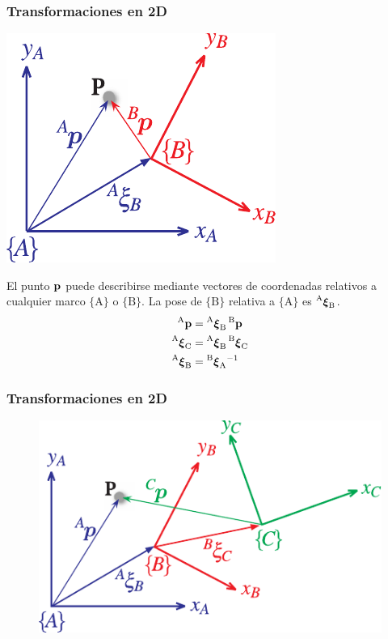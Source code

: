 \begin{frame}
    \frametitle{Transformaciones en 2D}
    \small
    \begin{center}
        \includegraphics[width=0.3\columnwidth]{./images/coordinate_frames.pdf}
    \end{center}


    El punto $\point$ puede describirse mediante vectores de coordenadas relativos a cualquier marco $\{\mathrm{A}\}$ o $\{\mathrm{B}\}$. La pose de $\{\mathrm{B}\}$ relativa a $\{\mathrm{A}\}$ es $\transform{A}{B}$.
    \begin{align*}
        \pointCoord{A} &= \transform{A}{B}\pointCoord{B}\\
        \transform{A}{C} &= \transform{A}{B}\transform{B}{C}\\
        \transform{A}{B} &= \transform{B}{A}^{-1}
    \end{align*}

\end{frame}


\begin{frame}
    \frametitle{Transformaciones en 2D}
    
    \begin{figure}[!h]
        \includegraphics[width=0.6\columnwidth]{./images/multiple_coordinate_frames_2d.pdf}
    \end{figure}

\end{frame}


